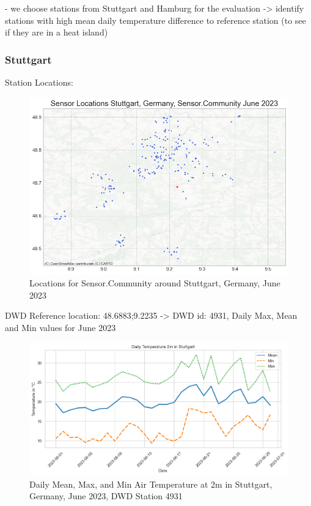 - we choose stations from Stuttgart and Hamburg for the evaluation
-> identify stations with high mean daily temperature difference to reference station (to see if they are in a heat island)

\subsubsection{Stuttgart}

Station Locations:\\

\begin{figure}[ht]
    \centering
    \includegraphics[width=1\textwidth]{images/sensor_community_locations_stuttgart_after_qc_june_23.png}
    \caption{Locations for Sensor.Community around Stuttgart, Germany, June 2023}
\end{figure}

DWD Reference location: 48.6883;9.2235 -> DWD id: 4931, Daily Max, Mean and Min values for June 2023\\

\begin{figure}[ht]
    \centering
    \includegraphics[width=1\textwidth]{images/dwd_stuttgart_june_23_tair_max_mean_min.png}
    \caption{Daily Mean, Max, and Min Air Temperature at 2m in Stuttgart, Germany, June 2023, DWD Station 4931}
    \label{fig:dwd mean max min stuttgart june 23}
\end{figure}

